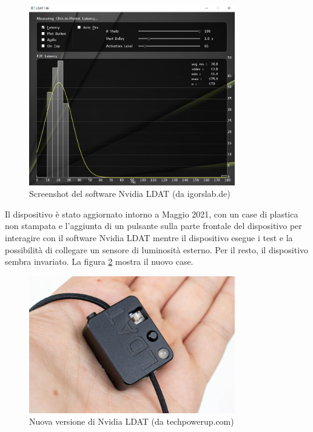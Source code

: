 \begin{figure}[h!]
	\centering
	\includegraphics[width=0.8\textwidth]{StatoDellArte_files/nvldat_software.jpg}
	\caption{Screenshot del software Nvidia LDAT (da igorslab.de)}
	\label{fig:nvldat_software}
\end{figure}

Il dispositivo è stato aggiornato intorno a Maggio 2021, con un case di plastica non stampata e l'aggiunta di un pulsante sulla parte frontale del dispositivo per interagire con il software Nvidia LDAT mentre il dispositivo esegue i test e la possibilità di collegare un sensore di luminosità esterno. Per il resto, il dispositivo sembra invariato. La figura \ref{fig:nvldat_v2} mostra il nuovo case.

\begin{figure}[h!]
	\centering
	\includegraphics[width=0.8\textwidth]{StatoDellArte_files/nvldat_v2.jpg}
	\caption{Nuova versione di Nvidia LDAT (da techpowerup.com)}
	\label{fig:nvldat_v2}
\end{figure}

